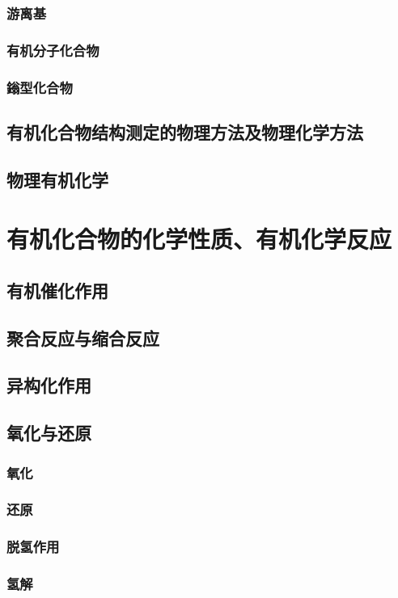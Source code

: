 \documentclass[UTF8]{../03-Chemistry}
\begin{document}
        \subsubsection{游离基}
        \subsubsection{有机分子化合物}
        \subsubsection{鎓型化合物}
    \subsection{有机化合物结构测定的物理方法及物理化学方法}
    \subsection{物理有机化学}

\section{有机化合物的化学性质、有机化学反应}
    \subsection{有机催化作用}
    \subsection{聚合反应与缩合反应}
    \subsection{异构化作用}
    \subsection{氧化与还原}
        \subsubsection{氧化}
        \subsubsection{还原}
        \subsubsection{脱氢作用}
        \subsubsection{氢解}
\end{document}
